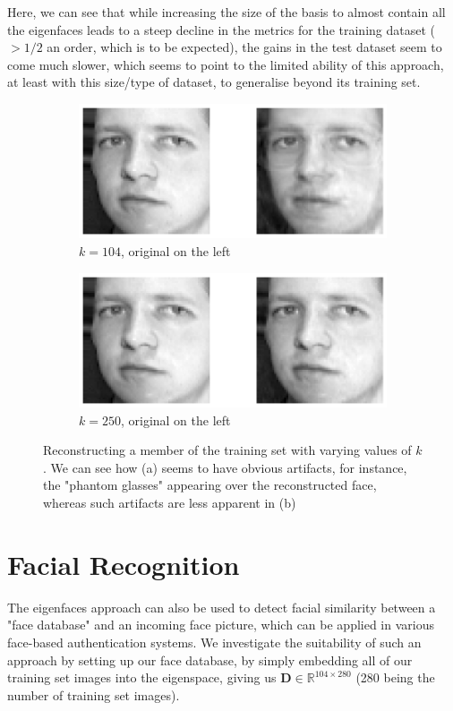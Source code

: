 \documentclass[article]{article}
\begin{document}
Here, we can see that while increasing the size of the basis to almost contain all the eigenfaces leads to a steep decline in the metrics for the training dataset ($> 1/2$ an order, which is to be expected), the gains in the test dataset seem to come much slower, which seems to point to the limited ability of this approach, at least with this size/type of dataset, to generalise beyond its training set.\bigskip

\begin{figure}[h]
    \centering
    \begin{subfigure}{.5\textwidth}
      \centering
      \includegraphics[width=.8\linewidth]{eigenfaces-104-recon.png}
      \caption{$k = 104$, original on the left}
      \label{fig:sfig1}
    \end{subfigure}%
    \begin{subfigure}{.5\textwidth}
      \centering
      \includegraphics[width=.8\linewidth]{eigenfaces-250-recon.png}
      \caption{$k = 250$, original on the left}
      \label{fig:sfig2}
    \end{subfigure}
    \caption{\centering Reconstructing a member of the training set with varying values of $k$. We can see how (a) seems to have obvious artifacts, for instance, the "phantom glasses" appearing over the reconstructed face, whereas such artifacts are less apparent in (b)}
\end{figure}

\section{Facial Recognition}
The eigenfaces approach can also be used to detect facial similarity between a "face database" and an incoming face picture, which can be applied in various face-based authentication systems. We investigate the suitability of such an approach by setting up our face database, by simply embedding all of our training set images into the eigenspace, giving us $\mathbf{D}\in \mathbb{R}^{104\times 280}$ (280 being the number of training set images).\bigskip
\end{document}
